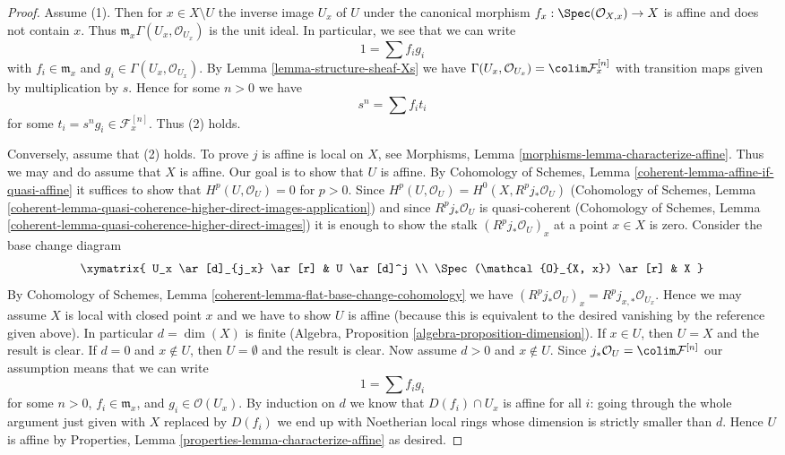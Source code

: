\begin{proof}
Assume (1). Then for $x \in X \setminus U$ the inverse image $U_x$ of $U$
under the canonical morphism $f_x : \Spec(\mathcal{O}_{X, x}) \to X$ is affine
and does not contain $x$. Thus $\mathfrak m_x \Gamma(U_x, \mathcal{O}_{U_x})$
is the unit ideal. In particular, we see that we can write
$$
1 = \sum f_i g_i
$$
with $f_i \in \mathfrak m_x$ and $g_i \in \Gamma(U_x, \mathcal{O}_{U_x})$.
By Lemma \ref{lemma-structure-sheaf-Xs} we have
$\Gamma(U_x, \mathcal{O}_{U_x}) = \colim \mathcal{F}^{[n]}_x$
with transition maps given by multiplication by $s$.
Hence for some $n > 0$ we have
$$
s^n = \sum f_i t_i
$$
for some $t_i = s^ng_i \in \mathcal{F}^{[n]}_x$. Thus (2) holds.

\medskip\noindent
Conversely, assume that (2) holds. To prove $j$ is affine is local on $X$,
see Morphisms, Lemma \ref{morphisms-lemma-characterize-affine}.
Thus we may and do assume that $X$ is affine. Our goal is to
show that $U$ is affine.
By Cohomology of Schemes, Lemma \ref{coherent-lemma-affine-if-quasi-affine}
it suffices to show that $H^p(U, \mathcal{O}_U) = 0$ for $p > 0$.
Since $H^p(U, \mathcal{O}_U) = H^0(X, R^pj_*\mathcal{O}_U)$
(Cohomology of Schemes, Lemma
\ref{coherent-lemma-quasi-coherence-higher-direct-images-application})
and since $R^pj_*\mathcal{O}_U$ is quasi-coherent
(Cohomology of Schemes, Lemma
\ref{coherent-lemma-quasi-coherence-higher-direct-images})
it is enough to show the stalk $(R^pj_*\mathcal{O}_U)_x$
at a point $x \in X$ is zero. Consider the base change diagram
$$
\xymatrix{
U_x \ar[d]_{j_x} \ar[r] & U \ar[d]^j \\
\Spec(\mathcal{O}_{X, x}) \ar[r] & X
}
$$
By Cohomology of Schemes, Lemma
\ref{coherent-lemma-flat-base-change-cohomology} we have
$(R^pj_*\mathcal{O}_U)_x = R^pj_{x, *}\mathcal{O}_{U_x}$.
Hence we may assume $X$ is local with closed point $x$
and we have to show $U$ is affine (because this is equivalent to
the desired vanishing by the reference given above).
In particular $d = \dim(X)$ is finite
(Algebra, Proposition \ref{algebra-proposition-dimension}).
If $x \in U$, then $U = X$ and the result is clear.
If $d = 0$ and $x \not \in U$, then $U = \emptyset$
and the result is clear. Now assume $d > 0$ and $x \not \in U$.
Since $j_*\mathcal{O}_U = \colim \mathcal{F}^{[n]}$
our assumption means that we can write
$$
1 = \sum f_i g_i
$$
for some $n > 0$, $f_i \in \mathfrak m_x$, and $g_i \in \mathcal{O}(U_x)$.
By induction on $d$ we know that $D(f_i) \cap U_x$ is affine
for all $i$: going through the whole argument just given with
$X$ replaced by $D(f_i)$ we end up with Noetherian local rings
whose dimension is strictly smaller than $d$. Hence $U$
is affine by Properties, Lemma \ref{properties-lemma-characterize-affine}
as desired.
\end{proof}





